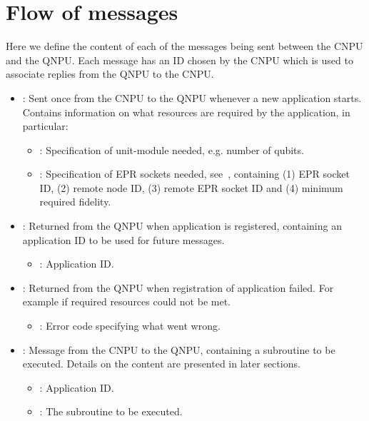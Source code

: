 \section{Flow of messages}
\label{netqasm:sec:app-messages}
Here we define the content of each of the messages being sent between the \ac{CNPU} and the \ac{QNPU}.
Each message has an ID chosen by the \ac{CNPU} which is used to associate replies from the \ac{QNPU} to the \ac{CNPU}.
\begin{itemize}
  \item {}:
        Sent once from the \ac{CNPU} to the \ac{QNPU} whenever a new application starts.
        Contains information on what resources are required by the application, in particular:
        \begin{itemize}
            \item {}: Specification of unit-module needed, e.g. number of qubits.
            \item {}: Specification of EPR sockets needed, see~\cite{kozlowski2020networklayer}, containing
                (1) EPR socket ID,
                (2) remote node ID,
                (3) remote EPR socket ID and
                (4) minimum required fidelity.
        \end{itemize}
  \item {}:
            Returned from the \ac{QNPU} when application is registered, containing an application ID to be used for future messages.
            \begin{itemize}
                \item {}: Application ID.
            \end{itemize}
  \item {}:
        Returned from the \ac{QNPU} when registration of application failed.
        For example if required resources could not be met.
        \begin{itemize}
            \item {}: Error code specifying what went wrong.
        \end{itemize}
  \item {}:
        Message from the \ac{CNPU} to the \ac{QNPU}, containing a subroutine to be executed.
        Details on the content are presented in later sections.
        \begin{itemize}
            \item {}: Application ID.
            \item {}: The subroutine to be executed.

\end{itemize}
\end{itemize}
